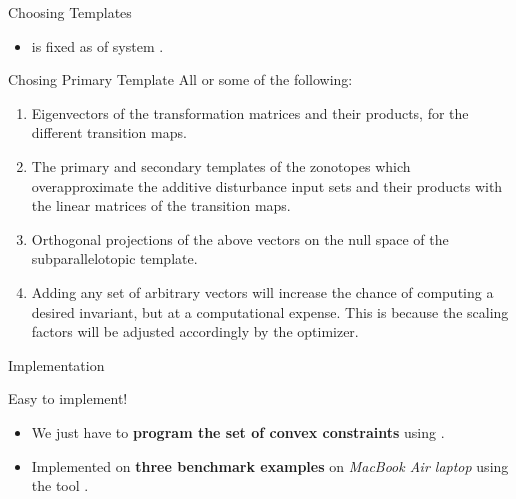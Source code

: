 \begin{frame}{Choosing Templates}
\begin{itemize}
\item {} is fixed as  of system .\pause
\end{itemize}
\begin{block}{Chosing Primary Template}
All or some of the following:\pause
\begin{enumerate}
\item Eigenvectors of the transformation matrices and their products, for
   the different transition maps.  \pause  
\item  The primary and
   secondary templates of the zonotopes which overapproximate the
   additive disturbance input sets and their products with the linear
   matrices of the transition maps.  \pause
\item
   Orthogonal projections of the above vectors on the null space of
   the subparallelotopic template.  \pause
\item Adding any set of arbitrary vectors will increase the
   chance of computing a desired invariant, but at a computational
   expense.  This is because the scaling factors will be adjusted
   accordingly by the optimizer.
\end{enumerate}
\end{block}
\end{frame}

\begin{frame}{Implementation}
\begin{block}{Easy to implement!}
\begin{itemize}
\item We just have to {\bf program the set of convex constraints} using .
\item Implemented on {\bf three benchmark examples} on \emph{MacBook Air laptop} using the tool .
\end{itemize}
\end{block}
\end{frame}

